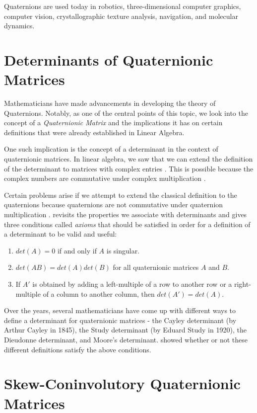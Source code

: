 Quaternions are used today in robotics, three-dimensional computer graphics, computer vision, crystallographic texture analysis, navigation, and molecular dynamics. 

\section{Determinants of Quaternionic Matrices}

Mathematicians have made advancements in developing the theory of Quaternions. Notably, as one of the central points of this topic, we look into the concept of a \emph{Quaternionic Matrix} and the implications it has on certain definitions that were already established in Linear Algebra. 

One such implication is the concept of a determinant in the context of quaternionic matrices. In linear algebra, we saw that we can extend the definition of the determinant to matrices with complex entries \cite{stamaria}. This is possible because the complex numbers are commutative under complex multiplication \cite{aslaksen}. 

Certain problems arise if we attempt to extend the classical definition to the quaternions because quaternions are not commutative under quaternion multiplication \cite{aslaksen}. \cite{aslaksen} revisits the properties we associate with determinants and gives three conditions called \emph{axioms} that should be satisfied in order for a definition of a determinant to be valid and useful:
\begin{enumerate}
	\item $det(A) = 0$ if and only if $A$ is singular.
	\item $det(AB) = det(A)det(B)$ for all quaternionic matrices $A$ and $B$.
	\item If $A'$ is obtained by adding a left-multiple of a row to another row or a right-multiple of a column to another column, then $det(A')=det(A)$.
\end{enumerate}

Over the years, several mathematicians have come up with different ways to define a determinant for quaternionic matrices - the Cayley determinant (by Arthur Cayley in 1845), the Study determinant (by Eduard Study in 1920), the Dieudonne determinant, and Moore's determinant. \cite{aslaksen} showed whether or not these different definitions satisfy the above conditions.

\section{Skew-Coninvolutory Quaternionic Matrices}

